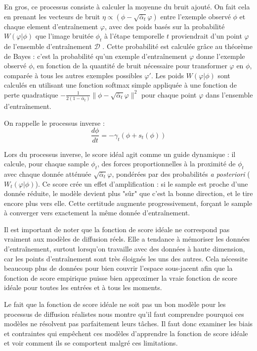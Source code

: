 \documentclass[a4paper,10pt]{article}
\theoremstyle{definition} %
\theoremstyle{definition} %
\theoremstyle{definition} %
\theoremstyle{definition} %
\begin{document}
En gros, ce processus consiste à calculer la moyenne du bruit ajouté. On fait cela en prenant les vecteurs de bruit $\eta \propto (\phi - \sqrt{\bar \alpha_t}\varphi)$ entre l'exemple observé $\phi$ et chaque element d'entraînement $\varphi$, avec des poids basés sur  la probabilité $W(\varphi|\phi)$ que l'image bruitée $\phi_t$ à l'étape temporelle $t$ proviendrait d'un point $\varphi$ de l'ensemble d'entraînement $\mathcal{D}$ . Cette probabilité est calculée grâce au théorème de Bayes : c'est la probabilité qu'un exemple d'entraînement $\varphi$ donne l'exemple observé $\phi$, en fonction de la quantité de bruit nécessaire pour transformer $\varphi$ en $\phi$, comparée à tous les autres exemples possibles $\varphi'$. Les poids $W(\varphi|\phi)$ sont calculés en utilisant une fonction softmax simple appliquée à une fonction de perte quadratique $-\frac{1}{2(1-\bar \alpha_t)}\|\phi - \sqrt{\bar \alpha_t}\varphi\|^2$ pour chaque point $\varphi$ dans l'ensemble d'entraînement.

On rappelle le processus inverse :
\begin{equation*}
    \frac{d\phi}{dt} =  -\gamma_t(\phi+s_t(\phi))
\end{equation*}

Lors du processus inverse, le score idéal agit comme un guide dynamique : il calcule, pour chaque sample \(\phi_t\), des forces proportionnelles à la proximité de \(\phi_t\) avec chaque donnée atténuée $\sqrt{\bar \alpha_t} \varphi$, pondérées par des probabilités \emph{a posteriori} (\(W_t(\varphi|\phi)\)). Ce score crée un effet d’amplification : si le sample est proche d’une donnée réduite, le modèle devient plus "sûr" que c’est la bonne direction, et le tire encore plus vers elle. Cette certitude augmente progressivement, forçant le sample à converger vers exactement la même donnée d’entraînement.

Il est important de noter que la fonction de score idéale ne correspond pas vraiment aux modèles de diffusion réels. Elle a tendance à mémoriser les données d'entraînement, surtout lorsqu'on travaille avec des données à haute dimension, car les points d'entraînement sont très éloignés les uns des autres. Cela nécessite beaucoup plus de données pour bien couvrir l'espace sous-jacent afin que la fonction de score empirique puisse bien approximer la vraie fonction de score idéale pour toutes les entrées et à tous les moments.

Le fait que la fonction de score idéale ne soit pas un bon modèle pour les processus de diffusion réalistes nous montre qu'il faut comprendre pourquoi ces modèles ne résolvent pas parfaitement leurs tâches. Il faut donc examiner les biais et contraintes qui empêchent ces modèles d'apprendre la fonction de score idéale et voir comment ils se comportent malgré ces limitations.
\end{document}
